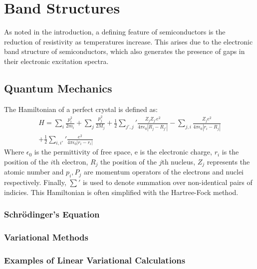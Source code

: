\section{Band Structures}
As noted in the introduction, a defining feature of semiconductors is the reduction of resistivity as temperatures increase. This arises due to the electronic band structure of semiconductors, which also generates the presence of gaps in their electronic excitation spectra. 

\subsection{Quantum Mechanics}
The Hamiltonian of a perfect crystal is defined as:
\begin{equation*}
\begin{aligned}
    H = \sum_{i}\frac{p_{i}^{2}}{2m_{i}} + \sum_{j}\frac{p_{j}^{2}}{2M_{j}} + \frac{1}{2}\sum_{j\prime,j}\prime\frac{Z_{j}Z_{j\prime}e^{2}}{4\pi\epsilon_{0}\left|R_{j}-R_{j\prime}\right|} - \sum_{j,i}\frac{Z_{j}e^{2}}{4\pi\epsilon_{0}\left|r_{i}-R_{j}\right|}\\ + \frac{1}{2}\sum_{i,i\prime}\prime\frac{e^{2}}{4\pi\epsilon_{0}\left|r_{i}-r_{i}\right|}
    \label{eq:hamiltonian_of_crystal_structure}
\end{aligned}
\end{equation*}
Where $\epsilon_{0}$ is the permittivity of free space, e is the electronic charge, $r_{i}$ is the position of the $i$th electron, $R_{j}$ the position of the $j$th nucleus, $Z_{j}$ represents the atomic number and $p_{i},P_{j}$ are momentum operators of the electrons and nuclei respectively. Finally, $\sum\prime$ is used to denote summation over non-identical pairs of indicies. This Hamiltonian is often simplified with the Hartree-Fock method.
\subsubsection{Schr{\"o}dinger's Equation}
\subsubsection{Variational Methods}
\subsubsection{Examples of Linear Variational Calculations}
